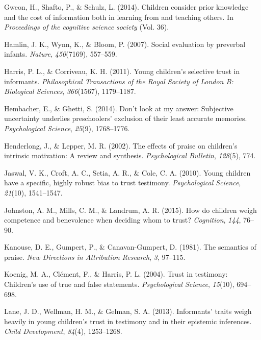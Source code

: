 \documentclass[10pt, letterpaper]{article}
\begin{document}
\hypertarget{ref-gweon2014children}{}
Gweon, H., Shafto, P., \& Schulz, L. (2014). Children consider prior
knowledge and the cost of information both in learning from and teaching
others. In \emph{Proceedings of the cognitive science society} (Vol.
36).

\hypertarget{ref-hamlin2007social}{}
Hamlin, J. K., Wynn, K., \& Bloom, P. (2007). Social evaluation by
preverbal infants. \emph{Nature}, \emph{450}(7169), 557--559.

\hypertarget{ref-harris2011young}{}
Harris, P. L., \& Corriveau, K. H. (2011). Young children's selective
trust in informants. \emph{Philosophical Transactions of the Royal
Society of London B: Biological Sciences}, \emph{366}(1567), 1179--1187.

\hypertarget{ref-hembacher2014don}{}
Hembacher, E., \& Ghetti, S. (2014). Don't look at my answer: Subjective
uncertainty underlies preschoolers' exclusion of their least accurate
memories. \emph{Psychological Science}, \emph{25}(9), 1768--1776.

\hypertarget{ref-henderlong2002effects}{}
Henderlong, J., \& Lepper, M. R. (2002). The effects of praise on
children's intrinsic motivation: A review and synthesis.
\emph{Psychological Bulletin}, \emph{128}(5), 774.

\hypertarget{ref-jaswal2010young}{}
Jaswal, V. K., Croft, A. C., Setia, A. R., \& Cole, C. A. (2010). Young
children have a specific, highly robust bias to trust testimony.
\emph{Psychological Science}, \emph{21}(10), 1541--1547.

\hypertarget{ref-johnston2015children}{}
Johnston, A. M., Mills, C. M., \& Landrum, A. R. (2015). How do children
weigh competence and benevolence when deciding whom to trust?
\emph{Cognition}, \emph{144}, 76--90.

\hypertarget{ref-kanouse1981semantics}{}
Kanouse, D. E., Gumpert, P., \& Canavan-Gumpert, D. (1981). The
semantics of praise. \emph{New Directions in Attribution Research},
\emph{3}, 97--115.

\hypertarget{ref-koenig2004trust}{}
Koenig, M. A., Clément, F., \& Harris, P. L. (2004). Trust in testimony:
Children's use of true and false statements. \emph{Psychological
Science}, \emph{15}(10), 694--698.

\hypertarget{ref-lane2013informants}{}
Lane, J. D., Wellman, H. M., \& Gelman, S. A. (2013). Informants' traits
weigh heavily in young children's trust in testimony and in their
epistemic inferences. \emph{Child Development}, \emph{84}(4),
1253--1268.
\end{document}
